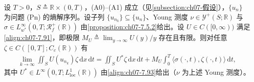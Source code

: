 \documentclass[../../main.tex]{subfiles}%
\begin{document}
\begin{proposition}\label{proposition:ch07-7.5.3}
设 $T>0$，$S\triangleq\mathbb{R}\times(0,T)$，(A0)--(A1) 成立（见\cref{subsection:ch07-假设}），$\{u_n\}$ 为问题 (Pn) 的熵解序列。设子列 $\{u_{n_k}\}\subseteq\{u_n\}$、Young 测度 $\nu\in\mathcal{Y}^+(S;\mathbb{R})$ 与 $\sigma\in L^\infty_{w^*}(0,T;\mathscr{R}_f^+(\mathbb{R}))$ 由\cref{proposition:ch07-7.5.2}给出。设 $U\in C([0,\infty))$ 满足\eqref{align:ch07-7.91}，即极限 $M_U\triangleq\lim_{y\to\infty}U(y)/y$ 存在且有限。则对任意 $\zeta\in C([0,T];C_c(\mathbb{R}))$ 有
\begin{align}
\lim_{k\to\infty}\iint_S U(u_{n_k})\zeta\,\mathrm{d}x\,\mathrm{d}t
=\iint_S U^*\zeta\,\mathrm{d}x\,\mathrm{d}t+M_U\int_0^T\langle\sigma(\cdot,t),\zeta(\cdot,t)\rangle\,\mathrm{d}t, \label{align:ch07-7.98}
\end{align}
其中 $U^*\in L^\infty(0,T;L^1_{\mathrm{loc}}(\mathbb{R}))$ 由\eqref{align:ch07-7.93}给出（$\nu$ 为上述 Young 测度）。
\end{proposition}
\end{document}

